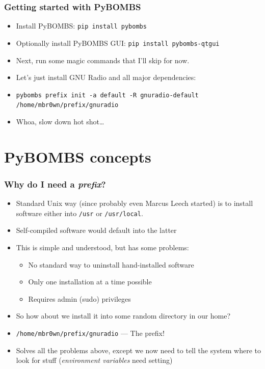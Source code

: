 \documentclass{beamer}
\begin{document}
\begin{frame}
  \frametitle{Getting started with PyBOMBS}
  \begin{itemize}
    \item Install PyBOMBS\@: \texttt{pip install pybombs}
    \item Optionally install PyBOMBS GUI\@: \texttt{pip install pybombs-qtgui}
    \item Next, run some magic commands that I'll skip for now.
    \item Let's just install GNU Radio and all major dependencies:
    \item {\footnotesize{\texttt{pybombs prefix init -a default -R gnuradio-default /home/mbr0wn/prefix/gnuradio}}}
    \item<2-> Whoa, slow down hot shot\ldots
  \end{itemize}
\end{frame}

\section{PyBOMBS concepts}
\begin{frame}
  \frametitle{Why do I need a \emph{prefix}?}
  \begin{itemize}
    \item Standard Unix way (since probably even Marcus Leech started) is to install software either into \texttt{/usr} or \texttt{/usr/local}.
    \item Self-compiled software would default into the latter
    \item This is simple and understood, but has some problems:
    \begin{itemize}
      \item No standard way to uninstall hand-installed software
      \item Only one installation at a time possible
      \item Requires admin (sudo) privileges
    \end{itemize}
    \item So how about we install it into some random directory in our home?
    \item \texttt{/home/mbr0wn/prefix/gnuradio} --- The prefix!
    \item Solves all the problems above, except we now need to tell the system where to look for stuff (\emph{environment variables} need setting)
  \end{itemize}
\end{frame}
\end{document}
